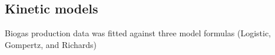 \subsection{Kinetic models}
Biogas production data was fitted against three model formulas (Logistic, Gompertz, and Richards)
